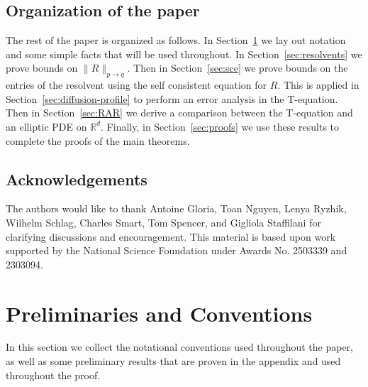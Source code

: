 \documentclass[11pt]{amsart}
\def\Real{{\mathbb R}}
\numberwithin{equation}{section}
\numberwithin{theorem}{section}
\begin{document}
\subsection*{Organization of the paper}
The rest of the paper is organized as follows.  In Section~\ref{sec:prelims} we lay out notation and some simple facts that will be used throughout. In Section~\ref{sec:resolvents} we prove bounds on $\|R\|_{p\to q}$.  Then in Section~\ref{sec:sce} we prove bounds on the entries of the resolvent using the self consistent equation for $R$.  This is applied in Section~\ref{sec:diffusion-profile} to perform an error analysis in the T-equation.  Then in Section~\ref{sec:RAR} we derive a comparison between the T-equation and an elliptic PDE on $\Real^d$.  Finally, in Section~\ref{sec:proofs} we use these results to complete the proofs of the main theorems.

\subsection*{Acknowledgements}
The authors would like to thank Antoine Gloria, Toan Nguyen, Lenya Ryzhik, Wilhelm Schlag, Charles Smart, Tom Spencer, and Gigliola Staffilani for clarifying discussions and encouragement.  This material is based upon work supported by the National Science Foundation under Awards No. 2503339 and 2303094.

\section{Preliminaries and Conventions}
\label{sec:prelims}
In this section we collect the notational conventions used throughout the paper, as well as some preliminary results that are proven in the appendix and used throughout the proof.
\end{document}
